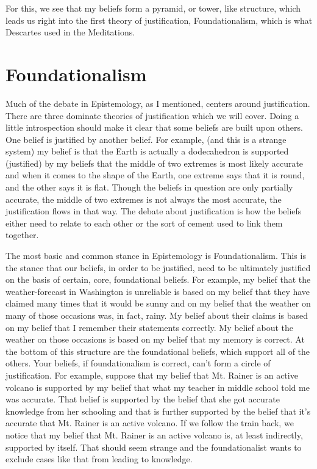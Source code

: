For this, we see that my beliefs form a pyramid, or tower, like structure, which leads us right into the first theory of justification, Foundationalism, which is what Descartes used in the Meditations.

\section{Foundationalism}
Much of the debate in Epistemology, as I mentioned, centers around justification. There are three dominate theories of justification which we will cover. Doing a little introspection should make it clear that some beliefs are built upon others. One belief is justified by another belief. For example, (and this is a strange system) my belief is that the Earth is actually a dodecahedron is supported (justified) by my beliefs that the middle of two extremes is most likely accurate and when it comes to the shape of the Earth, one extreme says that it is round, and the other says it is flat. Though the beliefs in question are only partially accurate, the middle of two extremes is not always the most accurate, the justification flows in that way. The debate about justification is how the beliefs either need to relate to each other or the sort of cement used to link them together.

The most basic and common stance in Epistemology is Foundationalism. This is the stance that our beliefs, in order to be justified, need to be ultimately justified on the basis of certain, core, foundational beliefs. For example, my belief that the weather-forecast in Washington is unreliable is based on my belief that they have claimed many times that it would be sunny and on my belief that the weather on many of those occasions was, in fact, rainy. My belief about their claims is based on my belief that I remember their statements correctly. My belief about the weather on those occasions is based on my belief that my memory is correct. At the bottom of this structure are the foundational beliefs, which support all of the others. Your beliefs, if foundationalism is correct, can't form a circle of justification. For example, suppose that my belief that Mt. Rainer is an active volcano is supported by my belief that what my teacher in middle school told me was accurate. That belief is supported by the belief that she got accurate knowledge from her schooling and that is further supported by the belief that it's accurate that Mt. Rainer is an active volcano. If we follow the train back, we notice that my belief that Mt. Rainer is an active volcano is, at least indirectly, supported by itself. That should seem strange and the foundationalist wants to exclude cases like that from leading to knowledge.

